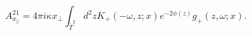 \begin{equation}
A_{x_{||}}^{21}=4\pi i\kappa x_\perp
\int_{\tilde T^2} d^2z
K_+(-\omega,z;x)e^{-2\phi(z)}g_+(z,\omega;x).
\end{equation}

